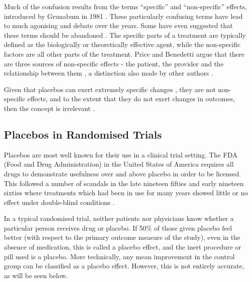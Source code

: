Much of the confusion results from the terms ``specific'' and ``non-specific'' effects, introduced by Grunabum in 1981 \cite{grunbaum1981placebo}. These particularly confusing terms have lead to much agonising and debate over the years. Some have even suggested that these terms should be abandoned \cite{Caspi2002}. The specific parts of a treatment are typically defined as the biologically or theoretically effective agent, while the non-specific factors are all other parts of the treatment. Price and Benedetti argue that there are three sources of non-specific effects - the patient, the provider and the relationship between them \cite{Price2008}, a distinction also made by other authors \cite{Finniss2005}.

Given that placebos can exert extremely specific changes \cite{Amanzio2001,Caspi2002}, they are not non-specific effects, and to the extent that they do not exert changes in outcomes, then the concept is irrelevant \cite{Moerman2003,Barrett2006}.  

\subsection{Placebos in Randomised Trials}
\label{sec:plac-rand-trials}

Placebos are most well known for their use in a clinical trial setting. The FDA (Food and Drug Administration) in the United States of America  requires all drugs to demonstrate usefulness over and above placebo in order to be licensed. This followed a number of scandals in the late nineteen fifties and early nineteen sixties where treatments which had been in use for many years showed little or no effect under double-blind conditions \cite{Moerman2000a}. 

In a typical randomised trial, neither patients nor physicians know whether a particular person receives drug or placebo.  If 50\% of those given placebo feel  better (with respect to the primary outcome measure of the study), even in the absence of medication, this is called a placebo effect, and the inert procedure or pill used is a placebo. More technically, any mean improvement in the control group can be classified as a placebo effect. However, this is not entirely accurate, as will be seen below.   




